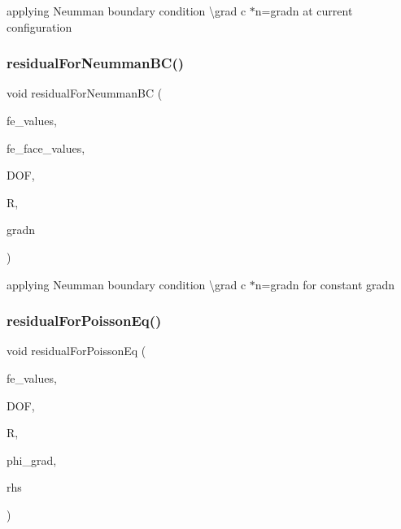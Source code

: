 applying Neumman boundary condition \textbackslash{}grad c $\ast$n=gradn at current configuration \mbox{\label{class_residual_a1e66cf9fc807561fc00cffb93c52d37d}} 
\subsubsection{\texorpdfstring{residualForNeummanBC()}{residualForNeummanBC()}\hspace{0.1cm}{\footnotesize\ttfamily [4/4]}}
{\footnotesize\ttfamily void residual\+For\+Neumman\+BC (\begin{DoxyParamCaption}\item[{const F\+E\+Values$<$ dim $>$ \&}]{fe\+\_\+values,  }\item[{const F\+E\+Face\+Values$<$ dim $>$ \&}]{fe\+\_\+face\+\_\+values,  }\item[{unsigned int}]{D\+OF,  }\item[{dealii\+::\+Table$<$ 1, T $>$ \&}]{R,  }\item[{double}]{gradn }\end{DoxyParamCaption})}

applying Neumman boundary condition \textbackslash{}grad c $\ast$n=gradn for constant gradn \mbox{\label{class_residual_af1d58eecf6eeae74de2f7ebc6a158b18}} 
\subsubsection{\texorpdfstring{residualForPoissonEq()}{residualForPoissonEq()}\hspace{0.1cm}{\footnotesize\ttfamily [1/4]}}
{\footnotesize\ttfamily void residual\+For\+Poisson\+Eq (\begin{DoxyParamCaption}\item[{const F\+E\+Values$<$ dim $>$ \&}]{fe\+\_\+values,  }\item[{unsigned int}]{D\+OF,  }\item[{dealii\+::\+Table$<$ 1, T $>$ \&}]{R,  }\item[{dealii\+::\+Table$<$ 2, T $>$ \&}]{phi\+\_\+grad,  }\item[{dealii\+::\+Table$<$ 1, T $>$ \&}]{rhs }\end{DoxyParamCaption})}

